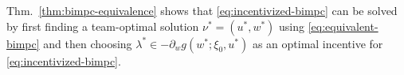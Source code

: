 Thm.~\ref{thm:bimpc-equivalence} shows that \eqref{eq:incentivized-bimpc} can be solved by first finding a team-optimal solution $\nu^*=(u^*, w^*)$ using \eqref{eq:equivalent-bimpc} and then choosing $\lambda^* \in -\partial_w g(w^*; \xi_0, u^*)$ as an optimal incentive for \eqref{eq:incentivized-bimpc}.
%
%
%
%
